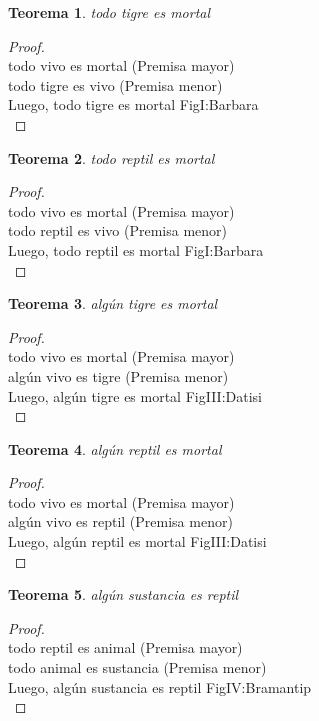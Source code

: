 ﻿\documentclass[12pt]{book}
\newtheorem{theorem}{Teorema}[chapter]
\newtheorem{proof}{Demostración}
\begin{document}
\begin{theorem}
todo tigre es mortal
\label{th: 61}
\end{theorem}\begin{proof}\\todo vivo es mortal	 (Premisa mayor) \\todo tigre es vivo	 (Premisa menor) \\Luego, todo tigre es mortal	FigI:Barbara \\ \end{proof}
\begin{theorem}
todo reptil es mortal
\label{th: 62}
\end{theorem}\begin{proof}\\todo vivo es mortal	 (Premisa mayor) \\todo reptil es vivo	 (Premisa menor) \\Luego, todo reptil es mortal	FigI:Barbara \\ \end{proof}
\begin{theorem}
algún tigre es mortal
\label{th: 63}
\end{theorem}\begin{proof}\\todo vivo es mortal	 (Premisa mayor) \\algún vivo es tigre	 (Premisa menor) \\Luego, algún tigre es mortal	FigIII:Datisi \\ \end{proof}
\begin{theorem}
algún reptil es mortal
\label{th: 64}
\end{theorem}\begin{proof}\\todo vivo es mortal	 (Premisa mayor) \\algún vivo es reptil	 (Premisa menor) \\Luego, algún reptil es mortal	FigIII:Datisi \\ \end{proof}
\begin{theorem}
algún sustancia es reptil
\label{th: 65}
\end{theorem}\begin{proof}\\todo reptil es animal	 (Premisa mayor) \\todo animal es sustancia	 (Premisa menor) \\Luego, algún sustancia es reptil	FigIV:Bramantip \\ \end{proof}
\end{document}
